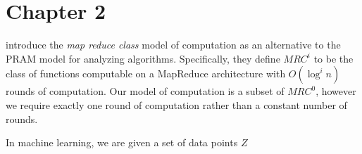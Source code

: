 \documentclass[thesis.tex]{subfiles}
\begin{document}
\chapter{Chapter 2}

\cite{karloff2010model} introduce the \emph{map reduce class} model of computation as an alternative to the PRAM model for analyzing algorithms.
Specifically, they define $MRC^i$ to be the class of functions computable on a MapReduce architecture with $O(\log^i n)$ rounds of computation.
Our model of computation is a subset of $MRC^0$,
however we require exactly one round of computation rather than a constant number of rounds.

\noindent
In machine learning, we are given a set of data points $Z$

\end{document}
